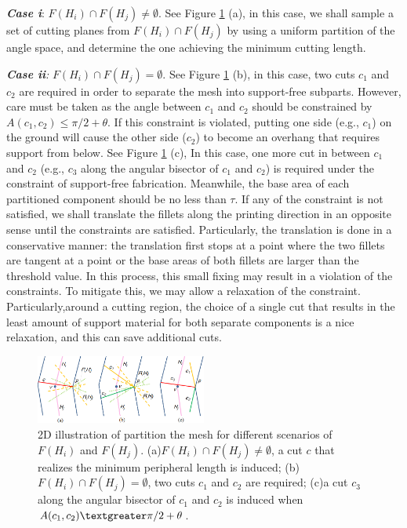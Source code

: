 \emph{\textbf{Case i}}: $F(H_i) \cap F(H_j) \neq \emptyset$. {\color{blue} See Figure \ref{fig:meshpartition} (a), } in this case, we shall sample a set of cutting planes from $F(H_i) \cap F(H_j)$ by using a uniform partition of the angle space, and determine the one achieving the minimum cutting length.

\emph{\textbf{Case ii}:} $F(H_i) \cap F(H_j) = \emptyset$. {\color{blue} See Figure \ref{fig:meshpartition} (b),} in this case, two cuts $c_1$ and $c_2$ are required in order to separate the mesh into support-free subparts. However, care must be taken as the angle between $c_1$ and $c_2$ should be constrained by $A(c_1, c_2) \leq \pi/2+\theta$. If this constraint is violated, putting one side (e.g., $c_1$) on the ground will cause the other side ($c_2$) to become an overhang that requires support from below. {\color{blue} See Figure \ref{fig:meshpartition} (c),} In this case, one more cut in between $c_1$ and $c_2$ (e.g., $c_3$ along the angular bisector of $c_1$ and $c_2$) is required under the constraint of support-free fabrication. Meanwhile, the base area of each partitioned component should be no less than $\tau$. If any of the constraint is not satisfied, we shall translate the fillets along the printing direction in an opposite sense until the constraints are satisfied. Particularly, the translation is done in a conservative manner: the translation first stops at a point where the two fillets are tangent at a point or the base areas of both fillets are larger than the threshold value. In this process, this small fixing may result in a violation of the constraints. To mitigate this, we may allow a relaxation of the constraint. Particularly,around a cutting region, the choice of a single cut that results in the least amount of support material for both separate components is a nice relaxation, and this can save additional cuts.

\begin{figure}[tbp]
  \centering
  \includegraphics[width=0.5\textwidth]{figs/meshpartition.png}
  \caption{\label{fig:meshpartition}%
           {\color{blue}2D illustration of partition the mesh for different scenarios of $F(H_i)$ and $F(H_j)$. (a)$F(H_i) \cap F(H_j) \neq \emptyset$, a cut $c$ that realizes the minimum peripheral length is induced; (b)$F(H_i) \cap F(H_j) = \emptyset$, two cuts $c_1$ and $c_2$ are required; (c)a cut $c_3$ along the angular bisector of $c_1$ and $c_2$ is induced when $A(c_1, c_2) \textgreater  \pi/2+\theta$.} }
\end{figure}

